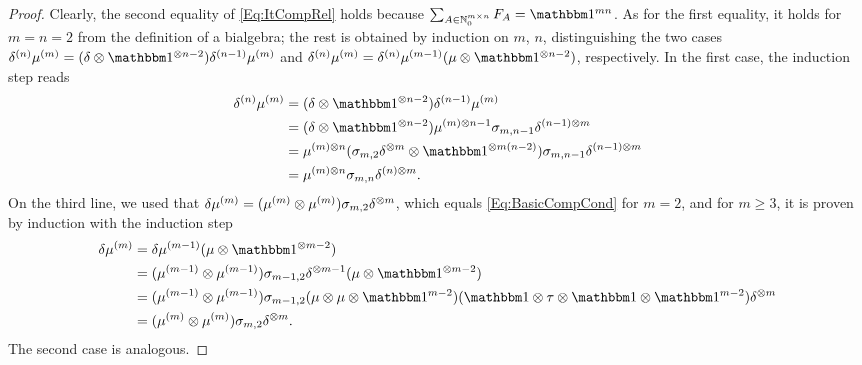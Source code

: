 \documentclass[\MainFolder/Text.tex]{subfiles}
\begin{document}
\begin{proof}
Clearly, the second equality of \eqref{Eq:ItCompRel} holds because $\sum_{A\in\N_0^{m\times n}} F_A = \Id^{mn}$. As for the first equality, it holds for $m=n=2$ from the definition of a bialgebra; the rest is obtained by induction on $m$, $n$, distinguishing the two cases $\MVCoProd^{(n)}\MVProd^{(m)} = (\MVCoProd\otimes\Id^{\otimes n-2})\MVCoProd^{(n-1)}\MVProd^{(m)}$ and $\MVCoProd^{(n)}\MVProd^{(m)} = \MVCoProd^{(n)}\MVProd^{(m-1)}(\mu\otimes\Id^{\otimes n-2})$, respectively. In the first case, the induction step reads
\begin{align*}
\MVCoProd^{(n)}\MVProd^{(m)} & = (\MVCoProd\otimes\Id^{\otimes n-2})\MVCoProd^{(n-1)}\MVProd^{(m)} \\
& = (\MVCoProd\otimes\Id^{\otimes n-2})\MVProd^{(m)\otimes n-1}\sigma_{m,n-1}\MVCoProd^{(n-1)\otimes m} \\
& = \MVProd^{(m)\otimes n}(\sigma_{m,2} \MVCoProd^{\otimes m} \otimes \Id^{\otimes m(n-2)})\sigma_{m,n-1}\MVCoProd^{(n-1)\otimes m} \\
& = \MVProd^{(m)\otimes n} \sigma_{m,n} \delta^{(n)\otimes m}.
\end{align*}
On the third line, we used that $\delta\mu^{(m)}=(\mu^{(m)}\otimes\mu^{(m)})\sigma_{m,2}\delta^{\otimes m}$, which equals \eqref{Eq:BasicCompCond} for $m=2$, and for $m\ge 3$, it is proven by induction with the induction step
\begin{align*}
 \MVCoProd\MVProd^{(m)} & = \MVCoProd\MVProd^{(m-1)}(\MVProd\otimes\Id^{\otimes m-2}) \\
 & = (\MVProd^{(m-1)}\otimes\MVProd^{(m-1)})\sigma_{m-1,2}\MVCoProd^{\otimes m-1}(\MVProd\otimes\Id^{\otimes m-2}) \\
 & = (\MVProd^{(m-1)}\otimes\MVProd^{(m-1)})\sigma_{m-1,2}(\MVProd\otimes\MVProd \otimes\Id^{m-2})(\Id \otimes \tau\otimes \Id \otimes \Id^{m-2})\MVCoProd^{\otimes m} \\
 & = (\MVProd^{(m)}\otimes\MVProd^{(m)})\sigma_{m,2}\MVCoProd^{\otimes m}.
\end{align*}
The second case is analogous.
\end{proof}
\end{document}
